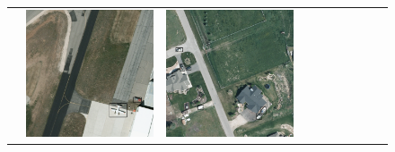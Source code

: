 \begin{figure}[h!]
\begin{tabularx}{\textwidth}{c|*{9}{X}}
    &  \includegraphics[trim={650pt 120pt 170pt 720pt},clip,width=\linewidth]{images/015Results/01abb_vs_obb/comp_images/ground_truth_abb/487.png}
    & \includegraphics[trim={230pt 200pt 680pt 725pt},clip,width=\linewidth]{images/015Results/01abb_vs_obb/comp_images/ground_truth_abb/509.png}

\end{tabularx}
\end{figure}

